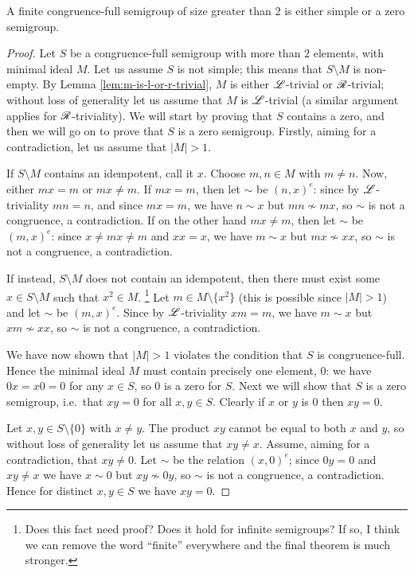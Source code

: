 \begin{lemma}
  \label{lem:simple-or-zero-semigroup}
  A finite congruence-full semigroup of size greater than $2$ is either simple
  or a zero semigroup.
  \begin{proof}
    Let $S$ be a congruence-full semigroup with more than $2$ elements, with
    minimal ideal $M$.  Let us assume $S$ is not simple; this means that
    $S \setminus M$ is non-empty.  By Lemma \ref{lem:m-is-l-or-r-trivial}, $M$
    is either $\mathrel{\mathscr{L}}$-trivial or $\mathrel{\mathscr{R}}$-trivial; without loss of generality let us
    assume that $M$ is $\mathrel{\mathscr{L}}$-trivial (a similar argument applies for
    $\mathrel{\mathscr{R}}$-triviality).  We will start by proving that $S$ contains a zero, and
    then we will go on to prove that $S$ is a zero semigroup.
    Firstly, aiming for a contradiction, let us assume that $|M| > 1$.

    If $S \setminus M$ contains an idempotent, call it $x$.  Choose $m,n \in M$
    with $m \neq n$.  Now, either $mx = m$ or $mx \neq m$.  If $mx = m$, then
    let $\sim$ be $(n,x)^e$: since by $\mathrel{\mathscr{L}}$-triviality $mn = n$, and since
    $mx = m$, we have $n \sim x$ but $mn \nsim mx$, so $\sim$ is not a
    congruence, a contradiction.  If on the other hand $mx \neq m$, then let
    $\sim$ be $(m,x)^e$: since $x \neq mx \neq m$ and $xx=x$, we have $m \sim x$
    but $mx \nsim xx$, so $\sim$ is not a congruence, a contradiction.

    If instead, $S \setminus M$ does not contain an idempotent, then there must
    exist some $x \in S \setminus M$ such that $x^2 \in M$.
    \footnote{Does this fact need proof?  Does it hold for infinite semigroups?
    If so, I think we can remove the word ``finite'' everywhere and the final
    theorem is much stronger.}
    Let $m \in M \setminus \{x^2\}$ (this is possible since $|M| > 1$) and let
    $\sim$ be $(m,x)^e$.  Since by $\mathrel{\mathscr{L}}$-triviality $xm = m$, we have $m \sim x$
    but $xm \nsim xx$, so $\sim$ is not a congruence, a contradiction.

    We have now shown that $|M| > 1$ violates the condition that $S$ is
    congruence-full.  Hence the minimal ideal $M$ must contain precisely one
    element, $0$: we have $0x = x0 = 0$ for any $x \in S$, so $0$ is a zero for
    $S$. Next we will show that $S$ is a zero semigroup, i.e.~that $xy = 0$ for
    all $x,y \in S$.  Clearly if $x$ or $y$ is $0$ then $xy = 0$.

    Let $x,y \in S \setminus \{0\}$ with $x \neq y$.  The product $xy$ cannot be
    equal to both $x$ and $y$, so without loss of generality let us assume that
    $xy \neq x$.  Assume, aiming for a contradiction, that $xy \neq 0$.  Let
    $\sim$ be the relation $(x,0)^e$; since $0y = 0$ and $xy \neq x$ we have
    $x \sim 0$ but $xy \nsim 0y$, so $\sim$ is not a congruence, a
    contradiction.  Hence for distinct $x,y \in S$ we have $xy = 0$.


\end{proof}
\end{lemma}
